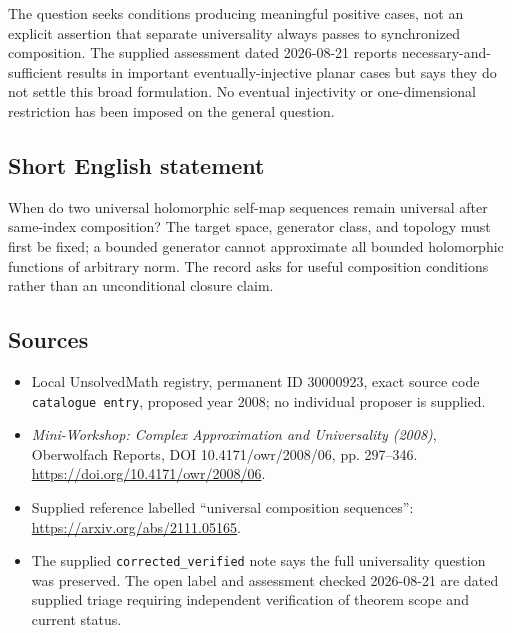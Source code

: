 \documentclass[11pt]{article}
\begin{document}
The question seeks conditions producing meaningful positive cases, not an explicit assertion that separate universality always passes to synchronized composition. The supplied assessment dated 2026-08-21 reports necessary-and-sufficient results in important eventually-injective planar cases but says they do not settle this broad formulation. No eventual injectivity or one-dimensional restriction has been imposed on the general question.
\subsection{Short English statement}
When do two universal holomorphic self-map sequences remain universal after same-index composition? The target space, generator class, and topology must first be fixed; a bounded generator cannot approximate all bounded holomorphic functions of arbitrary norm. The record asks for useful composition conditions rather than an unconditional closure claim.
\subsection{Sources}
\begin{itemize}
\item Local UnsolvedMath registry, permanent ID \(30000923\), exact source code \texttt{catalogue entry}, proposed year 2008; no individual proposer is supplied.
\item \emph{Mini-Workshop: Complex Approximation and Universality (2008)}, Oberwolfach Reports, DOI 10.4171/owr/2008/06, pp. 297--346. \url{https://doi.org/10.4171/owr/2008/06}.
\item Supplied reference labelled ``universal composition sequences'': \url{https://arxiv.org/abs/2111.05165}.
\item The supplied \texttt{corrected\_verified} note says the full universality question was preserved. The open label and assessment checked 2026-08-21 are dated supplied triage requiring independent verification of theorem scope and current status.
\end{itemize}
\end{document}
